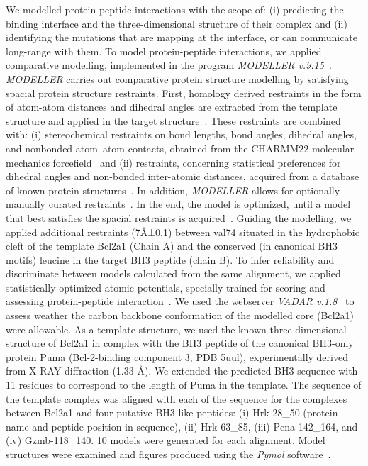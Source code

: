\documentclass[10pt,letterpaper]{article}
\begin{document}
We modelled protein-peptide interactions with the scope of: (i) predicting the binding interface and the three-dimensional structure of their complex and (ii) identifying the mutations that are mapping at the interface, or can communicate long-range with them.
To model protein-peptide interactions, we applied comparative modelling, implemented in the program \textit{MODELLER v.9.15}~\cite{Sali1993}.
\textit{MODELLER} carries out comparative protein structure modelling by satisfying spacial protein structure restraints. First, homology derived restraints in the form of atom-atom distances and dihedral angles are extracted from the template structure and applied in the target structure~\cite{Sali1993}. These restraints are combined with: (i) stereochemical restraints on bond lengths, bond angles, dihedral angles, and nonbonded atom–atom contacts, obtained from the CHARMM22 molecular mechanics forcefield~\cite{MacKerell1998} and (ii) restraints, concerning statistical preferences for dihedral angles and non-bonded inter-atomic distances, acquired from a database of known protein structures~\cite{Sali1994}. In addition, \textit{MODELLER} allows for optionally manually curated restraints~\cite{Eswar2003}. In the end, the model is optimized, until a model that best satisfies the spacial restraints is acquired~\cite{Marti-Renom2000}.
Guiding the modelling, we applied additional restraints (7Å±0.1) between val74 situated in the hydrophobic cleft of the template Bcl2a1 (Chain A) and the conserved (in canonical BH3 motifs) leucine in the target BH3 peptide (chain B). To infer reliability and discriminate between models calculated from the same alignment, we applied statistically optimized atomic potentials, specially trained for scoring and assessing protein-peptide interaction~\cite{Dong2018}. We used the webserver \textit{VADAR v.1.8}~\cite{Willard2003} to assess weather the carbon backbone conformation of the modelled core (Bcl2a1) were allowable.
As a template structure, we used the known three-dimensional structure of Bcl2a1 in complex with the BH3 peptide of the canonical BH3-only protein Puma (Bcl-2-binding component 3, PDB 5uul), experimentally derived from X-RAY diffraction (1.33 Å). We extended the predicted BH3 sequence with 11 residues to correspond to the length of Puma in the template. The sequence of the template complex was aligned with each of the sequence for the complexes between Bcl2a1 and four putative BH3-like peptides: (i) Hrk-28\_50 (protein name and peptide position in sequence), (ii) Hrk-63\_85, (iii) Pcna-142\_164, and (iv) Gzmb-118\_140. 10 models were generated for each alignment. Model structures were examined and figures produced using the \textit{Pymol} software~\cite{Schrodinger2015}.
\end{document}
